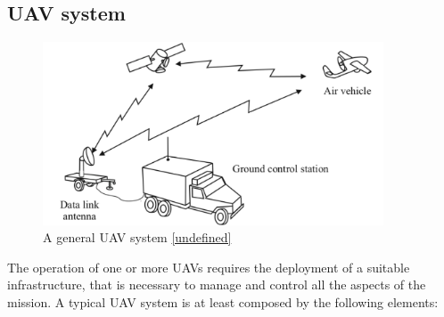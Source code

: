 \subsection{UAV system}

\begin{figure}[h]
    \centering
    \includegraphics[width=0.9\textwidth]{images/uav-system.png}
    \caption{A general UAV system \ref{undefined}}
    \label{fig:uav-system}
\end{figure}

The operation of one or more \glspl{UAV} requires the deployment of a suitable infrastructure, that is necessary to manage and control all the aspects of the mission. A typical \gls{UAV} system is at least composed by the following elements:

